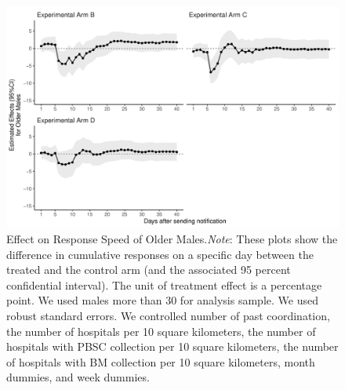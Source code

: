 \documentclass[12pt, a4paper]{article}
\begin{document}
\begin{figure}[H]
\includegraphics{JMDP RCT - Main Document_files/figure-latex/old-male-flow-1} \caption{Effect on Response Speed of Older Males.\newline \emph{Note}: These plots show the difference in cumulative responses on a specific day between the treated and the control arm (and the associated 95 percent confidential interval). The unit of treatment effect is a percentage point. We used males more than 30 for analysis sample. We used robust standard errors. We controlled number of past coordination, the number of hospitals per 10 square kilometers, the number of hospitals with PBSC collection per 10 square kilometers, the number of hospitals with BM collection per 10 square kilometers, month dummies, and week dummies.}\label{fig:old-male-flow}
\end{figure}
\end{document}
